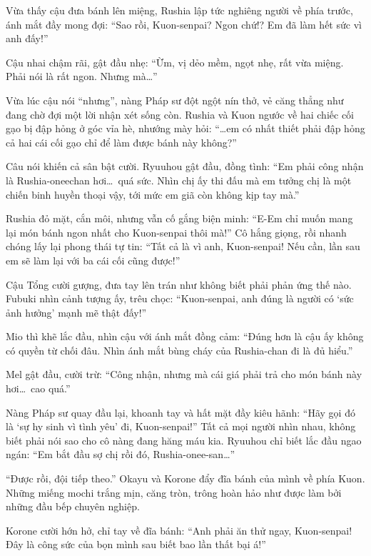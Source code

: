 \documentclass[../main.tex]{subfiles}
\begin{document}
Vừa thấy cậu đưa bánh lên miệng, Rushia lập tức nghiêng người về phía trước, ánh mắt đầy mong đợi: ``Sao rồi, Kuon-senpai? Ngon chứ!? Em đã làm hết sức vì anh đấy!''

Cậu nhai chậm rãi, gật đầu nhẹ: ``Ừm, vị dẻo mềm, ngọt nhẹ, rất vừa miệng. Phải nói là rất ngon. Nhưng mà\dots''

Vừa lúc cậu nói ``nhưng'', nàng Pháp sư đột ngột nín thở, vẻ căng thẳng như đang chờ đợi một lời nhận xét sống còn. Rushia và Kuon ngước về hai chiếc cối gạo bị đập hỏng ở góc vỉa hè, nhướng mày hỏi: ``\dots em có nhất thiết phải đập hỏng cả hai cái cối gạo chỉ để làm được bánh này không?''

Câu nói khiến cả sân bật cười. Ryuuhou gật đầu, đồng tình: ``Em phải công nhận là Rushia-oneechan hơi\dots\ quá sức. Nhìn chị ấy thi đấu mà em tưởng chị là một chiến binh huyền thoại vậy, tới mức em giã còn không kịp tay mà.''

Rushia đỏ mặt, cắn môi, nhưng vẫn cố gắng biện minh: ``E-Em chỉ muốn mang lại món bánh ngon nhất cho Kuon-senpai thôi mà!'' Cô hắng giọng, rồi nhanh chóng lấy lại phong thái tự tin: ``Tất cả là vì anh, Kuon-senpai! Nếu cần, lần sau em sẽ làm lại với ba cái cối cũng được!''

Cậu Tổng cười gượng, đưa tay lên trán như không biết phải phản ứng thế nào. Fubuki nhìn cảnh tượng ấy, trêu chọc: ``Kuon-senpai, anh đúng là người có `sức ảnh hưởng' mạnh mẽ thật đấy!''

Mio thì khẽ lắc đầu, nhìn cậu với ánh mắt đồng cảm: ``Đúng hơn là cậu ấy không có quyền từ chối đâu. Nhìn ánh mắt bùng cháy của Rushia-chan đi là đủ hiểu.''

Mel gật đầu, cười trừ: ``Công nhận, nhưng mà cái giá phải trả cho món bánh này hơi\dots\ cao quá.''

Nàng Pháp sư quay đầu lại, khoanh tay và hất mặt đầy kiêu hãnh: ``Hãy gọi đó là `sự hy sinh vì tình yêu' đi, Kuon-senpai!'' Tất cả mọi người nhìn nhau, không biết phải nói sao cho cô nàng đang hăng máu kia. Ryuuhou chỉ biết lắc đầu ngao ngán: ``Em bắt đầu sợ chị rồi đó, Rushia-onee-san\dots''

\ct

``Được rồi, đội tiếp theo.'' Okayu và Korone đẩy đĩa bánh của mình về phía Kuon. Những miếng mochi trắng mịn, căng tròn, trông hoàn hảo như được làm bởi những đầu bếp chuyên nghiệp.

Korone cười hớn hở, chỉ tay về đĩa bánh: ``Anh phải ăn thử ngay, Kuon-senpai! Đây là công sức của bọn mình sau biết bao lần thất bại á!''
\end{document}
